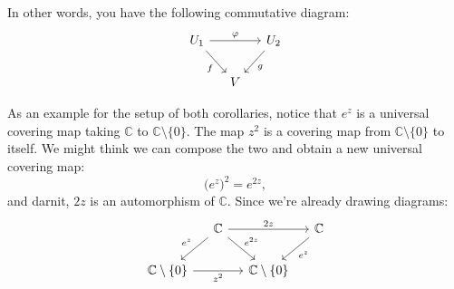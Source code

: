 \documentclass[12pt,openany]{book}
\newcommand{\C}{{\mathbb{C}}}
\theoremstyle{plain}
\theoremstyle{remark}
\theoremstyle{definition}
\theoremstyle{exercise}
\theoremstyle{example}
\begin{document}
In other words, you have the following commutative diagram:
\begin{equation*}
\begin{tikzcd}[column sep=small]
U_1 \arrow[rr,"\varphi"] \arrow[dr,"f"'] & & U_2 \arrow[dl,"g"] \\
                               & V
\end{tikzcd}
\end{equation*}

As an example for the setup of both corollaries,
notice that $e^z$ is a universal covering map taking $\C$ to $\C \setminus \{ 0 \}$.
The map $z^2$ is a covering map from $\C \setminus \{ 0 \}$ to itself.
We might think we can compose the two and obtain a new universal covering map:
\begin{equation*}
{\bigl(e^z\bigr)}^2 = e^{2z} ,
\end{equation*}
and darnit, $2z$ is an automorphism of $\C$.  Since we're already drawing
diagrams:
\begin{equation*}
\begin{tikzcd}[column sep=small]
& \C \arrow[dl,"e^z"'] \arrow[dr,"e^{2z}"] \arrow[rr,"2z"] & & \C \arrow[dl,"e^z"] \\
\C \setminus \{ 0 \} \arrow[rr,"z^2"'] & & \C \setminus \{ 0 \} 
\end{tikzcd}
\end{equation*}
\end{document}
